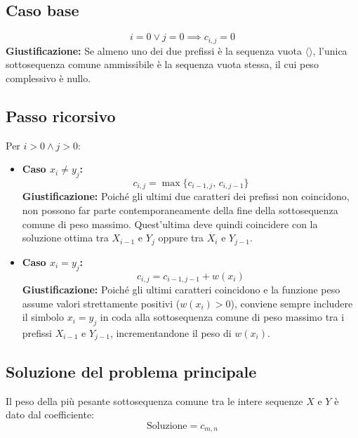 \subsection{Caso base}
\[
    i = 0 \lor j = 0 \implies c_{i,j} = 0
\]
\textbf{Giustificazione:} Se almeno uno dei due prefissi è la sequenza vuota $\langle \rangle$, l'unica sottosequenza comune ammissibile è la sequenza vuota stessa, il cui peso complessivo è nullo.

\subsection{Passo ricorsivo}
Per $i > 0 \land j > 0$:
\begin{itemize}
    \item \textbf{Caso $x_i \neq y_j$:}
    \[
        c_{i,j} = \max \{ c_{i-1, j}, \, c_{i, j-1} \}
    \]
    \textbf{Giustificazione:} Poiché gli ultimi due caratteri dei prefissi non coincidono, non possono far parte contemporaneamente della fine della sottosequenza comune di peso massimo. Quest'ultima deve quindi coincidere con la soluzione ottima tra $X_{i-1}$ e $Y_j$ oppure tra $X_i$ e $Y_{j-1}$.

    \item \textbf{Caso $x_i = y_j$:}
    \[
        c_{i,j} = c_{i-1, j-1} + w(x_i)
    \]
    \textbf{Giustificazione:} Poiché gli ultimi caratteri coincidono e la funzione peso assume valori strettamente positivi ($w(x_i) > 0$), conviene sempre includere il simbolo $x_i = y_j$ in coda alla sottosequenza comune di peso massimo tra i prefissi $X_{i-1}$ e $Y_{j-1}$, incrementandone il peso di $w(x_i)$.
\end{itemize}

\subsection{Soluzione del problema principale}
Il peso della più pesante sottosequenza comune tra le intere sequenze $X$ e $Y$ è dato dal coefficiente:
\[
    \text{Soluzione} = c_{m, n}
\]

